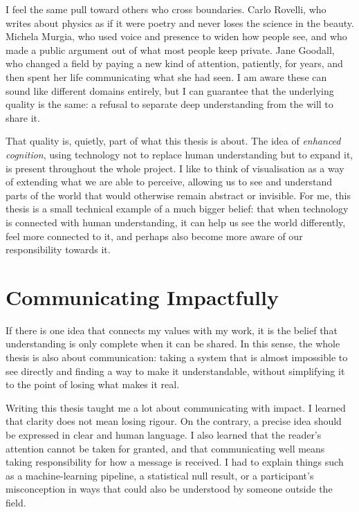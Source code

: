I feel the same pull toward others who cross boundaries. Carlo Rovelli, who writes about physics as if it were poetry and never loses the science in the beauty. Michela Murgia, who used voice and presence to widen how people see, and who made a public argument out of what most people keep private. Jane Goodall, who changed a field by paying a new kind of attention, patiently, for years, and then spent her life communicating what she had seen. I am aware these can sound like different domains entirely, but I can guarantee that the underlying quality is the same: a refusal to separate deep understanding from the will to share it.

That quality is, quietly, part of what this thesis is about. The idea of \emph{enhanced cognition}, using technology not to replace human understanding but to expand it, is present throughout the whole project. I like to think of visualisation as a way of extending what we are able to perceive, allowing us to see and understand parts of the world that would otherwise remain abstract or invisible. For me, this thesis is a small technical example of a much bigger belief: that when technology is connected with human understanding, it can help us see the world differently, feel more connected to it, and perhaps also become more aware of our responsibility towards it.

\section{Communicating Impactfully}
\label{sec:impact}

If there is one idea that connects my values with my work, it is the belief that understanding is only complete when it can be shared. In this sense, the whole thesis is also about communication: taking a system that is almost impossible to see directly and finding a way to make it understandable, without simplifying it to the point of losing what makes it real.

Writing this thesis taught me a lot about communicating with impact. I learned that clarity does not mean losing rigour. On the contrary, a precise idea should be expressed in clear and human language. I also learned that the reader's attention cannot be taken for granted, and that communicating well means taking responsibility for how a message is received. I had to explain things such as a machine-learning pipeline, a statistical null result, or a participant's misconception in ways that could also be understood by someone outside the field.


